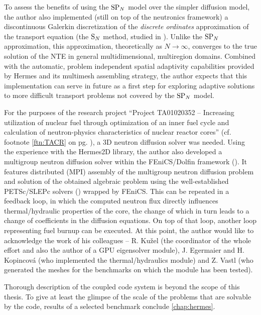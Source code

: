 To assess the benefits of using the $\text{SP}_{N}$ model over the simpler diffusion model, the author also implemented (still on top of the neutronics
framework) a discontinuous Galerkin discretization of the \textit{discrete ordinates} approximation of the transport
equation  (the $\text{S}_{N}$ method, studied in ). Unlike the $\text{SP}_{N}$ approximation, this approximation,
theoretically as $N\to\infty$, converges to the true solution of the NTE in general multidimensional, multiregion
domains. Combined with the automatic, problem independent spatial adaptivity capabilities provided by Hermes and its 
multimesh assembling strategy, the author expects that this implementation can serve in future as a first step
for exploring adaptive solutions to more difficult transport problems not covered by the $\text{SP}_{N}$ model.

For the purposes of the research project ``Project TA01020352 -- Increasing utilization of nuclear fuel through
optimization of an inner fuel cycle and calculation of neutron-physics characteristics of nuclear reactor cores''
(cf. footnote \ref{ftn:TACR} on pg. \pageref{ftn:TACR}), a 3D neutron diffusion solver was needed. Using the
experience with the Hermes2D library, the author also developed a multigroup neutron diffusion solver within the
FEniCS/Dolfin framework (\cite{dolfin1, dolfin2}).
It features distributed (MPI) assembly of the multigroup neutron diffusion problem and solution of the obtained algebraic problem using the well-established PETSc/SLEPc solvers (\cite{petsc1, slepc1})
wrapped by FEniCS. This can be repeated in a feedback loop, in which the computed
neutron flux directly influences thermal/hydraulic properties of the core, the change of which in turn leads to a change
of coefficients in the diffusion equations. On top of that loop, another loop representing fuel burnup can be executed. 
At this point, the author would like to acknowledge the work of his colleagues -- R. Ku{\v z}el (the coordinator of the 
whole effort and also the author of a GPU eigensolver module), J. Egermaier and H. Kopincov{\' a} (who implemented the 
thermal/hydraulics module) and Z. Vastl (who generated the meshes for the benchmarks on which the module has been
tested).

Thorough description of the coupled code system is beyond the scope of this thesis. To give at least the glimpse of the
scale of the problems that are solvable by the code, results of a selected benchmark conclude \cref{chap:hermes}.

